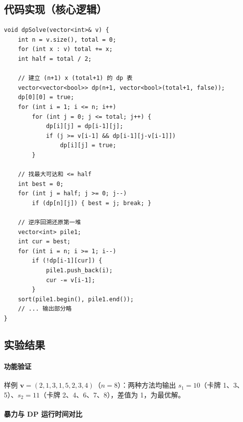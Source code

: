 \documentclass[12pt, a4paper]{ctexart}
\begin{document}
\subsection{代码实现（核心逻辑）}

\begin{lstlisting}[caption={动态规划求解（含回溯）}]
void dpSolve(vector<int>& v) {
    int n = v.size(), total = 0;
    for (int x : v) total += x;
    int half = total / 2;

    // 建立 (n+1) x (total+1) 的 dp 表
    vector<vector<bool>> dp(n+1, vector<bool>(total+1, false));
    dp[0][0] = true;
    for (int i = 1; i <= n; i++)
        for (int j = 0; j <= total; j++) {
            dp[i][j] = dp[i-1][j];
            if (j >= v[i-1] && dp[i-1][j-v[i-1]])
                dp[i][j] = true;
        }

    // 找最大可达和 <= half
    int best = 0;
    for (int j = half; j >= 0; j--)
        if (dp[n][j]) { best = j; break; }

    // 逆序回溯还原第一堆
    vector<int> pile1;
    int cur = best;
    for (int i = n; i >= 1; i--)
        if (!dp[i-1][cur]) {
            pile1.push_back(i);
            cur -= v[i-1];
        }
    sort(pile1.begin(), pile1.end());
    // ... 输出部分略
}
\end{lstlisting}

\subsection{实验结果}

\paragraph{功能验证}

样例 $\mathbf{v}=(2,1,3,1,5,2,3,4)$（$n=8$）：两种方法均输出
$s_1=10$（卡牌 1、3、5）、$s_2=11$（卡牌 2、4、6、7、8），差值为 1，为最优解。

\paragraph{暴力与 DP 运行时间对比}
\end{document}
